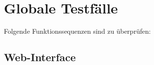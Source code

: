\documentclass[a4paper]{scrreprt}
\begin{document}






    \chapter{Globale Testfälle}

        Folgende Funktionssequenzen sind zu \"uberpr\"ufen:

        \section{\gls{Web-Interface}}
\end{document}
